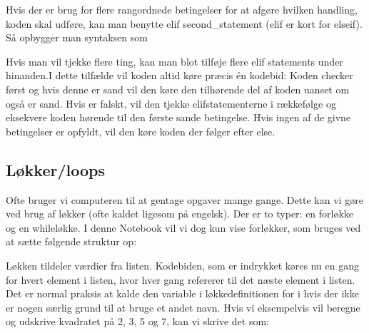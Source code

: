 \documentclass[letterpaper,10pt,english]{jupyterBook}
\begin{document}
Hvis der er brug for flere rangordnede betingelser for at afgøre hvilken handling, koden skal udføre, kan man benytte elif second\_statement (elif er kort for else\sphinxhyphen{}if). Så opbygger man syntaksen som

\begin{sphinxVerbatim}[commandchars=\\\{\}]
 
        
 
         
         
\end{sphinxVerbatim}

Hvis man vil tjekke flere ting, kan man blot tilføje flere elif statements under hinanden.I dette tilfælde vil koden altid køre præcis én kodebid: Koden checker først  og hvis denne er sand vil den  køre den tilhørende del af koden uanset om  også er sand. Hvis  er falskt, vil den tjekke elif\sphinxhyphen{}statementerne i rækkefølge og eksekvere koden hørende til den første sande betingelse. Hvis ingen af de givne betingelser er opfyldt, vil den køre koden der følger efter else.


\subsection{Løkker/loops}
\label{\detokenize{notebooks/Andet_python:lokker-loops}}
Ofte bruger vi computeren til at gentage opgaver mange gange. Dette kan vi gøre ved brug af løkker (ofte kaldet  ligesom på engelsk). Der er to typer: en for\sphinxhyphen{}løkke og en while\sphinxhyphen{}løkke. I denne Notebook vil vi dog kun vise for\sphinxhyphen{}løkker, som bruges ved at sætte følgende struktur op:

\begin{sphinxVerbatim}[commandchars=\\\{\}]
   
        
\end{sphinxVerbatim}

Løkken tildeler  værdier fra listen. Kodebiden, som er indrykket køres nu en gang for hvert element i listen, hvor  hver gang refererer til det næste element i listen. Det er normal praksis at kalde den variable i løkke\sphinxhyphen{}definitionen for i hvis der ikke er nogen særlig grund til at bruge et andet navn. Hvis vi eksempelvis vil beregne og udskrive kvadratet på 2, 3, 5 og 7, kan vi skrive det som:
\end{document}
